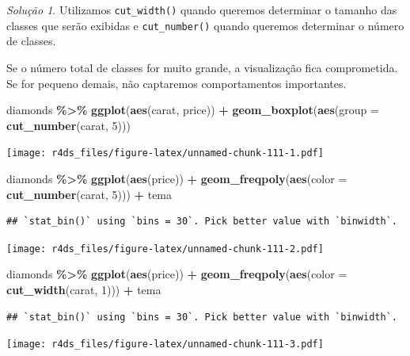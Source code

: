 \documentclass[
]{latex/krantz}
\newenvironment{Shaded}{\begin{snugshade}}{\end{snugshade}}
\newcommand{\AttributeTok}[1]{\textcolor[rgb]{0.13,0.29,0.53}{#1}}
\newcommand{\DecValTok}[1]{\textcolor[rgb]{0.00,0.00,0.81}{#1}}
\newcommand{\FunctionTok}[1]{\textcolor[rgb]{0.13,0.29,0.53}{\textbf{#1}}}
\newcommand{\NormalTok}[1]{#1}
\newcommand{\SpecialCharTok}[1]{\textcolor[rgb]{0.81,0.36,0.00}{\textbf{#1}}}
\theoremstyle{definition}
\theoremstyle{definition}
\theoremstyle{definition}
\theoremstyle{definition}
\theoremstyle{remark}
\newtheorem*{solution}{Solução}
\begin{document}
\begin{solution}
Utilizamos \texttt{cut\_width()} quando queremos determinar o tamanho das classes que serão exibidas e \texttt{cut\_number()} quando queremos determinar o número de classes.

Se o número total de classes for muito grande, a visualização fica comprometida. Se for pequeno demais, não captaremos comportamentos importantes.

\begin{Shaded}
\begin{Highlighting}[]
\NormalTok{diamonds }\SpecialCharTok{\%\textgreater{}\%}
    \FunctionTok{ggplot}\NormalTok{(}\FunctionTok{aes}\NormalTok{(carat, price)) }\SpecialCharTok{+}
        \FunctionTok{geom\_boxplot}\NormalTok{(}\FunctionTok{aes}\NormalTok{(}\AttributeTok{group =} \FunctionTok{cut\_number}\NormalTok{(carat, }\DecValTok{5}\NormalTok{)))}
\end{Highlighting}
\end{Shaded}

\texttt{[image: r4ds\_files/figure-latex/unnamed-chunk-111-1.pdf]}

\begin{Shaded}
\begin{Highlighting}[]
\NormalTok{diamonds }\SpecialCharTok{\%\textgreater{}\%}
    \FunctionTok{ggplot}\NormalTok{(}\FunctionTok{aes}\NormalTok{(price)) }\SpecialCharTok{+}
        \FunctionTok{geom\_freqpoly}\NormalTok{(}\FunctionTok{aes}\NormalTok{(}\AttributeTok{color =} \FunctionTok{cut\_number}\NormalTok{(carat, }\DecValTok{5}\NormalTok{))) }\SpecialCharTok{+}
\NormalTok{        tema}
\end{Highlighting}
\end{Shaded}

\begin{verbatim}
## `stat_bin()` using `bins = 30`. Pick better value with `binwidth`.
\end{verbatim}

\texttt{[image: r4ds\_files/figure-latex/unnamed-chunk-111-2.pdf]}

\begin{Shaded}
\begin{Highlighting}[]
\NormalTok{diamonds }\SpecialCharTok{\%\textgreater{}\%}
    \FunctionTok{ggplot}\NormalTok{(}\FunctionTok{aes}\NormalTok{(price)) }\SpecialCharTok{+}
        \FunctionTok{geom\_freqpoly}\NormalTok{(}\FunctionTok{aes}\NormalTok{(}\AttributeTok{color =} \FunctionTok{cut\_width}\NormalTok{(carat, }\DecValTok{1}\NormalTok{))) }\SpecialCharTok{+}
\NormalTok{        tema}
\end{Highlighting}
\end{Shaded}

\begin{verbatim}
## `stat_bin()` using `bins = 30`. Pick better value with `binwidth`.
\end{verbatim}

\texttt{[image: r4ds\_files/figure-latex/unnamed-chunk-111-3.pdf]}
\end{solution}
\end{document}

